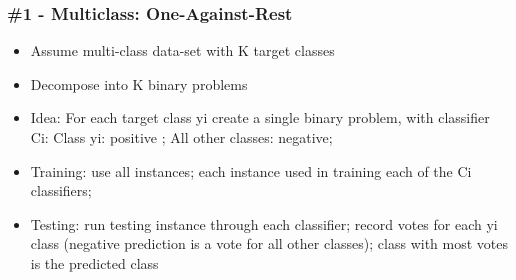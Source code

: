 \begin{frame}[fragile]\frametitle{\#1 - Multiclass: One-Against-Rest}
\begin{itemize}
\item Assume multi-class data-set with K target classes
\item Decompose into K binary problems
\item Idea: For each target class yi create a single binary problem, with classifier Ci:
Class yi: positive ;
All other classes: negative;
\item Training: 
use all instances; each instance used in training each of the Ci classifiers;
\item Testing: 
run testing instance through each classifier;
record votes for each yi class (negative prediction is a vote for all other classes);
class with most votes is the predicted class

\end{itemize}
\end{frame}


